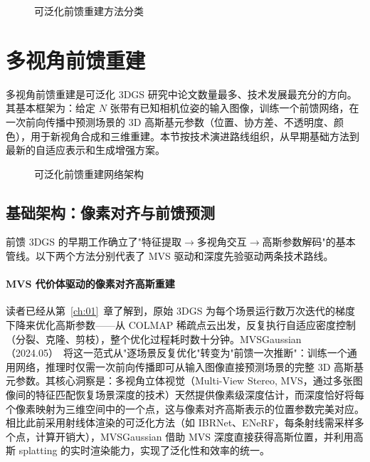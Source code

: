 \begin{figure}[htbp]
\centering
\resizebox{\textwidth}{!}{}
\caption{可泛化前馈重建方法分类}
\label{fig:ch13_feedforward_taxonomy}
\end{figure}

\section{多视角前馈重建}
\label{sec:13_1}

多视角前馈重建是可泛化 3DGS 研究中论文数量最多、技术发展最充分的方向。其基本框架为：给定 $N$ 张带有已知相机位姿的输入图像，训练一个前馈网络，在一次前向传播中预测场景的 3D 高斯基元参数（位置、协方差、不透明度、颜色），用于新视角合成和三维重建。本节按技术演进路线组织，从早期基础方法到最新的自适应表示和生成增强方案。

\begin{figure}[htbp]
\centering
\resizebox{\textwidth}{!}{}
\caption{可泛化前馈重建网络架构}
\label{fig:ch13_feedforward_arch}
\end{figure}

\subsection{基础架构：像素对齐与前馈预测}

前馈 3DGS 的早期工作确立了"特征提取$\to$多视角交互$\to$高斯参数解码"的基本管线。以下两个方法分别代表了 MVS 驱动和深度先验驱动两条技术路线。

\paragraph{MVS 代价体驱动的像素对齐高斯重建}

读者已经从第~\ref{ch:01}~章了解到，原始 3DGS 为每个场景运行数万次迭代的梯度下降来优化高斯参数——从 COLMAP 稀疏点云出发，反复执行自适应密度控制（分裂、克隆、剪枝），整个优化过程耗时数十分钟。MVSGaussian（2024.05）~\cite{2405_12218}将这一范式从"逐场景反复优化"转变为"前馈一次推断"：训练一个通用网络，推理时仅需一次前向传播即可从输入图像直接预测场景的完整 3D 高斯基元参数。其核心洞察是：多视角立体视觉（Multi-View Stereo, MVS，通过多张图像间的特征匹配恢复场景深度的技术）天然提供像素级深度估计，而深度恰好将每个像素映射为三维空间中的一个点，这与像素对齐高斯表示的位置参数完美对应。相比此前采用射线体渲染的可泛化方法（如 IBRNet、ENeRF，每条射线需采样多个点，计算开销大），MVSGaussian 借助 MVS 深度直接获得高斯位置，并利用高斯 splatting 的实时渲染能力，实现了泛化性和效率的统一。

